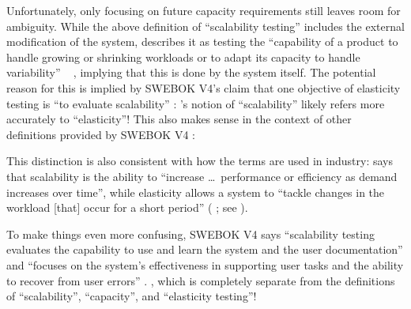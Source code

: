Unfortunately, only focusing on future capacity requirements still leaves room
for ambiguity. While the above definition of ``scalability testing'' includes the
external modification of the system,
\ifnotpaper \citeauthor{ISO_IEC2023a} \else \cite{ISO_IEC2023a} \fi describes it as
testing the ``capability of a product to handle growing or shrinking
workloads or to adapt its capacity to handle variability''%
\ifnotpaper\ \citeyearpar{ISO_IEC2023a}%
\fi, implying that this is done by the system itself.
The potential reason for this is implied by SWEBOK V4's claim that one
objective of elasticity testing is ``to evaluate scalability''
\citep[p.~5-9]{SWEBOK2024}:
\ifnotpaper \citeauthor{ISO_IEC2023a}%
\else \cite{ISO_IEC2023a}%
\fi's notion of ``scalability''
likely refers more accurately to ``elasticity''! This also makes sense in the
context of other definitions provided by SWEBOK V4 \citep{SWEBOK2024}:
This distinction is also consistent with how the terms are used in industry:
\ifnotpaper \citeauthor{Pandey2023} \else \cite{Pandey2023} \fi says
that scalability is the ability to ``increase
\dots\ performance or efficiency as demand increases over time'', while
elasticity allows a system to ``tackle changes in the workload [that] occur for
a short period'' (%
\ifnotpaper \citeyear{Pandey2023};
\fi see ).

To make things even more confusing, SWEBOK V4 says ``scalability
testing evaluates the capability to use and learn the system and the user
documentation'' and ``focuses on the system's effectiveness in supporting user
tasks and the ability to recover from user errors'' \citep[p.~5-9]{SWEBOK2024}.
\swebokScalDef{}, which is completely separate from the definitions of
``scalability'', ``capacity'', and ``elasticity testing''!